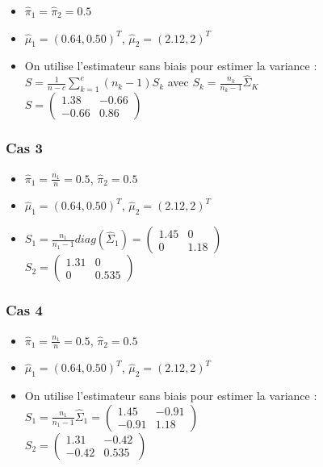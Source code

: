 \documentclass[a4paper,11pt]{article}
\begin{document}
\begin{itemize}
\item $\hat\pi_1 = \hat\pi_2 = 0.5$ \\ 
\item $\hat\mu_1 = (0.64,0.50)^T$, $\hat\mu_2 = (2.12,2)^T$\\
\item On utilise l'estimateur sans biais pour estimer la variance : \\
	$S = \frac{1}{n-c} \displaystyle \sum^{c}_{k=1} (n_k - 1) S_k$ avec $S_k = \frac{n_k}{n_k-1} \hat\Sigma_K$ \\
	$S = \begin{pmatrix}1.38&-0.66\\-0.66&0.86\end{pmatrix}$
	

\end{itemize}

\subsubsection{Cas 3}

\begin{itemize}
\item $\hat\pi_1 = \frac{n_1}{n} = 0.5$, $\hat\pi_2 = 0.5$ \\
\item $\hat\mu_1 = (0.64,0.50)^T$, $\hat\mu_2 = (2.12,2)^T$\\
\item $S_1 = \frac{n_1}{n_1 -1}diag(\hat\Sigma_1) = \begin{pmatrix}1.45&0\\0&1.18\end{pmatrix}$\\
$S_2=\begin{pmatrix}1.31&0\\0&0.535\end{pmatrix}$

\end{itemize}

\subsubsection{Cas 4}

\begin{itemize}
\item $\hat\pi_1 = \frac{n_1}{n} = 0.5$, $\hat\pi_2 = 0.5$ \\
\item $\hat\mu_1 = (0.64,0.50)^T$, $\hat\mu_2 = (2.12,2)^T$\\
\item On utilise l'estimateur sans biais pour estimer la variance : \\$S_1 = \frac{n_1}{n_1 -1}\hat\Sigma_1 = \begin{pmatrix}1.45&-0.91\\-0.91&1.18\end{pmatrix}$\\
$S_2=\begin{pmatrix}1.31&-0.42\\-0.42&0.535\end{pmatrix}$
\end{itemize}
\end{document}
